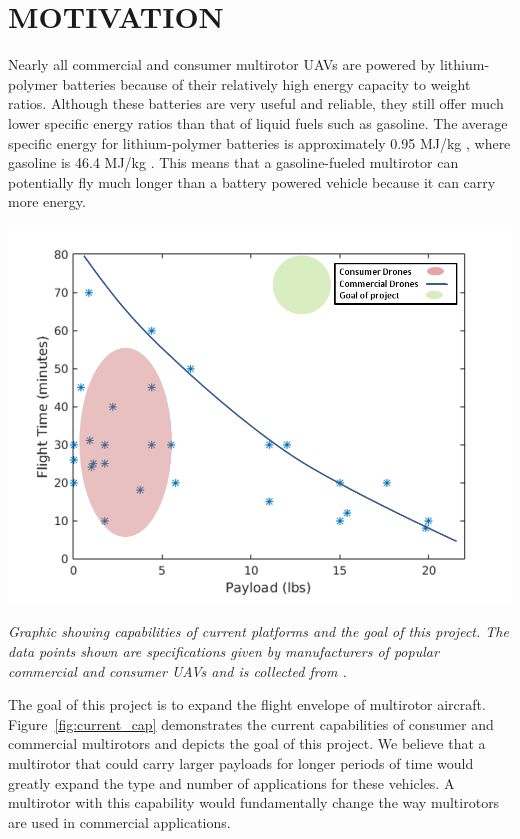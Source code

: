 \documentclass[letterpaper, 10 pt, conference]{ieeeconf}  %
\makeatletter
\newenvironment{figurehere}
  {\def\@captype{figure}}
  {}
\makeatother
\begin{document}
\section{MOTIVATION}

Nearly all commercial and consumer multirotor UAVs are powered by lithium-polymer batteries because of their relatively high energy capacity to weight ratios. Although these batteries are very useful and reliable, they still offer much lower specific energy ratios than that of liquid fuels such as gasoline. The average specific energy for lithium-polymer batteries is approximately 0.95 MJ/kg \cite{Battuni2016}, where gasoline is 46.4 MJ/kg \cite{energyed2016}. This means that a gasoline-fueled multirotor can potentially fly much longer than a battery powered vehicle because it can carry more energy.

\begin{figurehere}
	\begin{center}
		\includegraphics[width=.5\textwidth]{current_capabilities.png}
		\caption{\textit{Graphic showing capabilities of current platforms and the goal of this project. The data points shown are specifications given by manufacturers of popular commercial and consumer UAVs and is collected from \cite{drones2016}.}} 
		\label{fig:current_cap}
	\end{center}
\end{figurehere}

The goal of this project is to expand the flight envelope of multirotor aircraft.  Figure~\ref{fig:current_cap} demonstrates the current capabilities of consumer and commercial multirotors and depicts the goal of this project.  We believe that a multirotor that could carry larger payloads for longer periods of time would greatly expand the type and number of applications for these vehicles. A multirotor with this capability would fundamentally change the way multirotors are used in commercial applications. 

\end{document}
